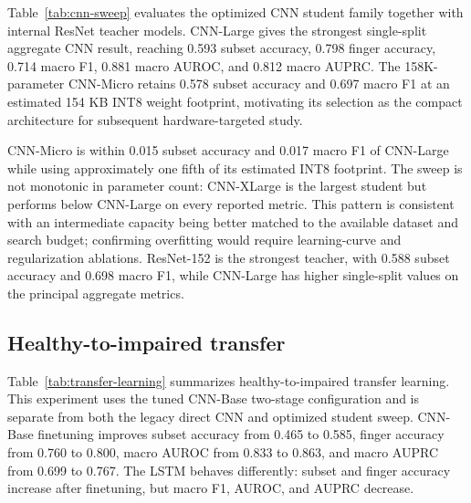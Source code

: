 Table~\ref{tab:cnn-sweep} evaluates the optimized CNN student family together with internal ResNet teacher models. CNN-Large gives the strongest single-split aggregate CNN result, reaching 0.593 subset accuracy, 0.798 finger accuracy, 0.714 macro F1, 0.881 macro AUROC, and 0.812 macro AUPRC. The 158K-parameter CNN-Micro retains 0.578 subset accuracy and 0.697 macro F1 at an estimated 154 KB INT8 weight footprint, motivating its selection as the compact architecture for subsequent hardware-targeted study.

\begin{table}[!htbp]
  \centering
  \small
  \caption{CNN-family evaluation. Student parameter counts and INT8 sizes describe model scale; ResNet rows provide high-capacity teacher references. Bold numbers mark the best score in each column, and $\dagger$ marks the compact architecture carried into deployment-oriented development.}
  \label{tab:cnn-sweep}
  \resizebox{\linewidth}{!}{}
\end{table}

CNN-Micro is within 0.015 subset accuracy and 0.017 macro F1 of CNN-Large while using approximately one fifth of its estimated INT8 footprint. The sweep is not monotonic in parameter count: CNN-XLarge is the largest student but performs below CNN-Large on every reported metric. This pattern is consistent with an intermediate capacity being better matched to the available dataset and search budget; confirming overfitting would require learning-curve and regularization ablations. ResNet-152 is the strongest teacher, with 0.588 subset accuracy and 0.698 macro F1, while CNN-Large has higher single-split values on the principal aggregate metrics.
\FloatBarrier

\subsection{Healthy-to-impaired transfer}

Table~\ref{tab:transfer-learning} summarizes healthy-to-impaired transfer learning. This experiment uses the tuned CNN-Base two-stage configuration and is separate from both the legacy direct CNN and optimized student sweep. CNN-Base finetuning improves subset accuracy from 0.465 to 0.585, finger accuracy from 0.760 to 0.800, macro AUROC from 0.833 to 0.863, and macro AUPRC from 0.699 to 0.767. The LSTM behaves differently: subset and finger accuracy increase after finetuning, but macro F1, AUROC, and AUPRC decrease.

